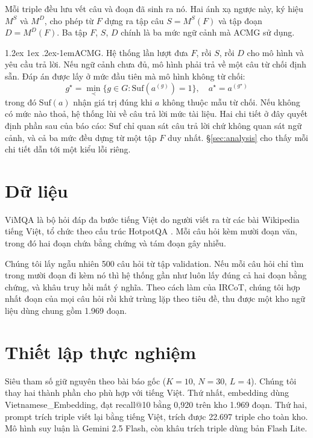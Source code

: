 \documentclass[11pt]{article}
\makeatletter
\renewcommand\paragraph{\@startsection{paragraph}{4}{\z@}%
  {1.2ex \@plus1ex \@minus.2ex}{-1em}{\normalfont\normalsize\bfseries}}
\makeatother
\begin{document}
Mỗi triple đều lưu vết câu và đoạn đã sinh ra nó. Hai ánh xạ ngược này, ký hiệu $M^S$ và
$M^D$, cho phép từ $F$ dựng ra tập câu $S = M^S(F)$ và tập đoạn $D = M^D(F)$. Ba tập $F$,
$S$, $D$ chính là ba mức ngữ cảnh mà ACMG sử dụng.

\paragraph{ACMG.} Hệ thống lần lượt đưa $F$, rồi $S$, rồi $D$ cho mô hình và yêu cầu trả
lời. Nếu ngữ cảnh chưa đủ, mô hình phải trả về một câu từ chối định sẵn. Đáp án được lấy ở
mức đầu tiên mà mô hình không từ chối:
\begin{equation}
\label{eq:acmg}
g^\star = \min_{\prec}\{g \in G : \mathrm{Suf}(a^{(g)}) = 1\},\quad a^\star = a^{(g^\star)}
\end{equation}
trong đó $\mathrm{Suf}(a)$ nhận giá trị đúng khi $a$ không thuộc mẫu từ chối. Nếu không có
mức nào thoả, hệ thống lùi về câu trả lời mức tài liệu. Hai chi tiết ở đây quyết định phần
sau của báo cáo: $\mathrm{Suf}$ chỉ quan sát câu trả lời chứ không quan sát ngữ cảnh, và cả
ba mức đều dựng từ một tập $F$ duy nhất. \S\ref{sec:analysis} cho thấy mỗi chi tiết dẫn tới
một kiểu lỗi riêng.

\section{Dữ liệu}
\label{sec:data}

ViMQA \citep{le2022vimqa} là bộ hỏi đáp đa bước tiếng Việt do người viết ra từ các bài
Wikipedia tiếng Việt, tổ chức theo cấu trúc HotpotQA \citep{yang2018hotpotqa}. Mỗi câu hỏi
kèm mười đoạn văn, trong đó hai đoạn chứa bằng chứng và tám đoạn gây nhiễu.

Chúng tôi lấy ngẫu nhiên 500 câu hỏi từ tập validation. Nếu mỗi câu hỏi chỉ tìm trong mười
đoạn đi kèm nó thì hệ thống gần như luôn
lấy đúng cả hai đoạn bằng chứng, và khâu truy hồi mất ý nghĩa. Theo cách làm của IRCoT,
chúng tôi hợp nhất đoạn của mọi câu hỏi rồi khử trùng lặp theo tiêu đề, thu được một kho
ngữ liệu dùng chung gồm 1.969 đoạn.

\section{Thiết lập thực nghiệm}
\label{sec:setup}

Siêu tham số giữ nguyên theo bài báo gốc ($K{=}10$, $N{=}30$, $L{=}4$). Chúng tôi thay hai
thành phần cho phù hợp với tiếng Việt. Thứ nhất, embedding dùng Vietnamese\_Embedding, đạt
recall@10 bằng 0,920 trên kho 1.969 đoạn. Thứ hai, prompt trích triple viết lại bằng tiếng
Việt, trích được 22.697 triple cho toàn kho. Mô hình suy luận là Gemini 2.5 Flash, còn khâu
trích triple dùng bản Flash Lite.
\end{document}

